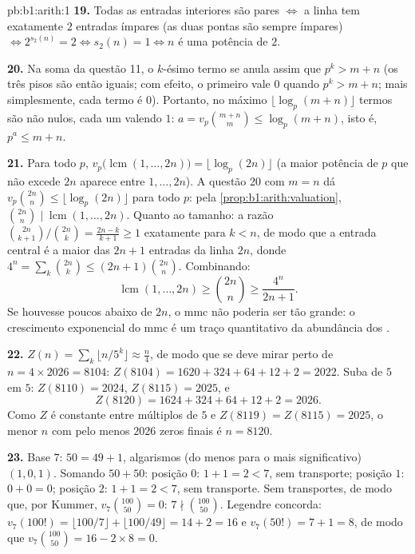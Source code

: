 \begin{solution}{pb:b1:arith:1}
\textbf{19.} Todas as entradas interiores são pares $\iff$ a linha tem
exatamente $2$ entradas ímpares (as duas pontas são sempre ímpares)
$\iff 2^{s_2(n)} =
2 \iff s_2(n) = 1 \iff n$ é uma potência de $2$.

\textbf{20.} Na soma da questão 11, o $k$-ésimo termo se anula assim
que $p^k > m + n$ (os três pisos são então iguais; com efeito, o
primeiro vale $0$ quando $p^k > m+n$; mais simplesmente, cada termo é $0$).
Portanto, no máximo $\lfloor \log_p(m+n)\rfloor$ termos são não nulos, cada
um valendo $1$: $a = v_p\binom{m+n}m \leq \log_p(m+n)$, isto é, $p^a \leq
m + n$.

\textbf{21.} Para todo  $p$, $v_p\bigl(\operatorname{lcm}(1,
\dots, 2n)\bigr) = \lfloor\log_p(2n)\rfloor$ (a maior potência de
$p$ que não excede $2n$ aparece entre $1, \dots, 2n$). A questão 20
com $m = n$ dá $v_p\binom{2n}n \leq \lfloor\log_p(2n)\rfloor$
para todo $p$: pela \cref{prop:b1:arith:valuation}, $\binom{2n}n
\mid \operatorname{lcm}(1, \dots, 2n)$. Quanto ao tamanho: a razão
$\binom{2n}{k+1}/\binom{2n}k = \frac{2n-k}{k+1} \geq 1$ exatamente
para $k < n$, de modo que a entrada central é a maior das $2n + 1$
entradas da linha $2n$, donde $4^n = \sum_k \binom{2n}k \leq
(2n+1)\binom{2n}n$. Combinando:
\[
\operatorname{lcm}(1, \dots, 2n) \geq \binom{2n}n \geq
\frac{4^n}{2n + 1} .
\]
Se houvesse poucos  abaixo de $2n$, o mmc não poderia ser tão
grande: o crescimento exponencial do mmc é um traço quantitativo da
abundância dos .

\textbf{22.} $Z(n) = \sum_k\lfloor n/5^k\rfloor \approx \frac
n4$, de modo que se deve mirar perto de $n = 4 \times 2026 = 8104$: $Z(8104) = 1620 +
324 + 64 + 12 + 2 = 2022$. Suba de $5$ em $5$: $Z(8110)
= 2024$, $Z(8115) = 2025$, e
\[
Z(8120) = 1624 + 324 + 64 + 12 + 2 = 2026 .
\]
Como $Z$ é constante entre múltiplos de $5$ e $Z(8119) =
Z(8115) = 2025$, o menor $n$ com pelo menos $2026$ zeros
finais é $n = 8120$.

\textbf{23.} Base $7$: $50 = 49 + 1$, algarismos (do menos para o mais
significativo) $(1, 0,
1)$. Somando $50 + 50$: posição $0$: $1 + 1 = 2 < 7$, sem transporte;
posição $1$: $0 + 0 = 0$; posição $2$: $1 + 1 = 2 < 7$, sem
transporte. Sem transportes, de modo que, por Kummer, $v_7\binom{100}{50} = 0$: $7 \nmid
\binom{100}{50}$. Legendre concorda: $v_7(100!) = \lfloor 100/7
\rfloor + \lfloor 100/49 \rfloor = 14 + 2 = 16$ e $v_7(50!) = 7
+ 1 = 8$, de modo que $v_7\binom{100}{50} = 16 - 2\times8 = 0$.


\end{solution}
